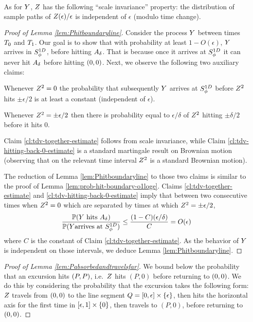 {{As for $Y$, $Z$ has the following ``scale invariance''
property: the distribution of sample paths of $Z(\epsilon) /
\epsilon$ is independent of $\epsilon$ (modulo time change).

\begin{proof}[Proof of Lemma \ref{lem:Phitboundaryline}]
Consider the process $Y$ between times $T_0$ and
$T_1$. Our goal is to show that with probability at least
$1-O(\epsilon)$, $Y$ arrives in $S^{1D}_{\phi}$, before hitting
$A_\delta$. That is because once it arrives at $S^{1D}_{\phi}$ it
can never hit $A_\delta$ before hitting $(0,0)$. Next, we observe the
following two auxiliary claims:

\begin{claim}\label{cl:tdv-together-estimate}
  Whenever $Z^2=0$ the probability that subsequently $Y$
  arrives at $S^{1D}_{\phi}$ before $Z^2$ hits $\pm\epsilon/2$ is at
  least a constant (independent of $\epsilon$).
\end{claim}

\begin{claim}\label{cl:tdv-hitting-back-0-estimate}
  Whenever $Z^2=\pm\epsilon/2$ then there is probability equal to
  $\epsilon/\delta$ of $Z^2$ hitting $\pm\delta/2$ before it hits $0$.
\end{claim}

Claim \ref{cl:tdv-together-estimate} follows from scale invariance, while
Claim \ref{cl:tdv-hitting-back-0-estimate} is a standard martingale result on
Brownian motion (observing that on the relevant time interval $Z^2$ is a
standard Brownian motion).

The reduction of Lemma \ref{lem:Phitboundaryline} to those two claims is
similar to the proof of Lemma \ref{lem:prob-hit-boundary-o1loge}. Claims
\ref{cl:tdv-together-estimate} and \ref{cl:tdv-hitting-back-0-estimate} imply
that between two consecutive times when $Z^2=0$ which are separated
by times at which $Z^2 = \pm\epsilon/2$,
\[
\frac{\mathbb{P}(Y\text{ hits }A_\delta)}{\mathbb{P}(Y\text{arrives at }S^{1D}_{\phi})}
\le \frac{(1-C)(\epsilon/\delta)}{C} =O(\epsilon)
\]
where $C$ is the constant of Claim \ref{cl:tdv-together-estimate}. As the
behavior of $Y$ is independent on those intervals, we deduce Lemma
\ref{lem:Phitboundaryline}.

\end{proof}
}
\begin{proof}[Proof of Lemma \ref{lem:Pabsorbedandtravelsfar}]
\newcommand{\rotfarpoint}{(P,0)}
\newcommand{\segment}{[\epsilon,1] \cross \{0\}}
We bound below the probability that an excursion hits $(P,P)$,
i.e.\ $Z$ hits $\rotfarpoint$ before returning to $(0,0)$.
We do this by considering the probability that the excursion takes
the following form: $Z$ travels from $(0,0)$ to the line
segment $Q = [0, \epsilon] \times \{\epsilon\}$, then hits the horizontal
axis for the first time in $\segment$, then travels to $\rotfarpoint$,
before returning to $(0,0)$.


\end{proof}}

